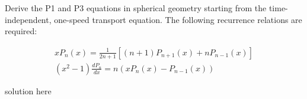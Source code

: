 \documentclass[12pts]{exam}
\begin{document}
\begin{questions}
        \question[20] Derive the P1 and P3 equations in spherical geometry starting from the time-independent, one-speed transport equation. The following recurrence relations are required:

        \begin{align}
                xP_n(x) = \frac{1}{2n+1}\left[(n+1)P_{n+1}(x) + n 
                P_{n-1}(x)\right]\\
                (x^2 -1) \frac{dP_n}{dx} = n (xP_n(x)  - P_{n-1}(x))
        \end{align}
        \begin{solution}
                solution here
        \end{solution}
\end{questions}



%
%
\end{document}
